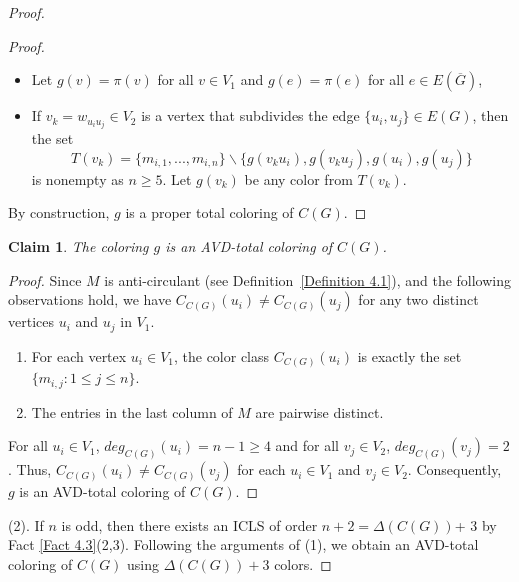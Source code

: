 \documentclass[12pt,reqno,a4paper]{amsart}
\theoremstyle{definition}
\theoremstyle{plain}
\newtheorem{claim}[defn]{Claim}
\begin{document}
\begin{proof}
\begin{proof}
\begin{itemize}
    \item Let $g(v)=\pi(v)$ for all $v\in V_{1}$ and $g(e)=\pi(e)$ for all $e\in E(\overline{G})$,
     \vspace{2mm}
     
    \item If $v_{k}=w_{u_{i}u_{j}}\in V_{2}$ is a vertex that subdivides the edge $\{u_{i},u_{j}\}\in E(G)$, then the set \[T(v_k)=\{m_{i,1},...,m_{i,n}\}\backslash \{g(v_{k}u_{i}),g(v_{k}u_{j}), g(u_{i}), g(u_{j})\}\] is nonempty as $n\geq 5$.
    Let $g(v_{k})$ be any color from $T(v_k)$.
\end{itemize}
By construction, $g$ is a proper total coloring of $C(G)$.
\end{proof}

\begin{claim}\label{Claim 4.11}
The coloring $g$ is an AVD-total coloring of $C(G)$.
\end{claim}

\begin{proof}
Since $M$ is anti-circulant (see Definition~\ref{Definition 4.1}), and the following observations hold, we have
$
C_{C(G)}(u_i)\neq C_{C(G)}(u_j)
$
for any two distinct vertices $u_i$ and $u_j$ in $V_1$.

\begin{enumerate}
    \item For each vertex $u_i \in V_1$, the color class $C_{C(G)}(u_i)$ is exactly the set $\{m_{i,j} : 1 \leq j \leq n\}$.
    \item The entries in the last column of $M$ are pairwise distinct.
\end{enumerate}

For all $u_{i}\in V_{1}$,
$deg_{C(G)}(u_i)=n-1\geq 4$ and for all $v_{j}\in V_{2}$, $deg_{C(G)}(v_{j})=2$. Thus, $C_{C(G)}(u_{i})\neq C_{C(G)}(v_{j})$ for each $u_{i}\in V_{1}$ and $v_{j}\in V_{2}$. Consequently, $g$ is an AVD-total coloring of $C(G)$. 
\end{proof}



(2). If $n$ is odd, then there exists an ICLS of order  $n+2=\Delta(C(G))$+ 3 by Fact \ref{Fact 4.3}(2,3).
Following the arguments of (1), we obtain an AVD-total coloring of $C(G)$ using $\Delta(C(G)) + 3$ colors. 
\end{proof}
\end{document}
